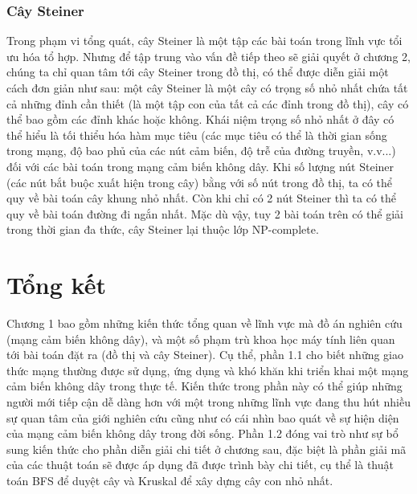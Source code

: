 \subsubsection{Cây Steiner}
Trong phạm vi tổng quát, cây Steiner là một tập các bài toán trong lĩnh vực tổi ưu hóa tổ hợp. Nhưng để tập trung vào vấn đề tiếp theo sẽ giải quyết ở chương 2, chúng ta chỉ quan tâm tới cây Steiner trong đồ thị, có thể được diễn giải một cách đơn giản như sau: một cây Steiner là một cây có trọng số nhỏ nhất chứa tất cả những đỉnh cần thiết (là một tập con của tất cả các đỉnh trong đồ thị), cây có thể bao gồm các đỉnh khác hoặc không. Khái niệm trọng số nhỏ nhất ở đây có thể hiểu là tối thiểu hóa hàm mục tiêu (các mục tiêu có thể là thời gian sống trong mạng, độ bao phủ của các nút cảm biến, độ trễ của đường truyền, v.v...) đối với các bài toán trong mạng cảm biến không dây. Khi số lượng nút Steiner (các nút bắt buộc xuất hiện trong cây) bằng với số nút trong đồ thị, ta có thể quy về bài toán cây khung nhỏ nhất. Còn khi chỉ có 2 nút Steiner thì ta có thể quy về bài toán đường đi ngắn nhất. Mặc dù vậy, tuy 2 bài toán trên có thể giải trong thời gian đa thức, cây Steiner lại thuộc lớp NP-complete.\cite{karp1972reducibility}

\section{Tổng kết}
Chương 1 bao gồm những kiến thức tổng quan về lĩnh vực mà đồ án nghiên cứu (mạng cảm biến không dây), và một số phạm trù khoa học máy tính liên quan tới bài toán đặt ra (đồ thị và cây Steiner). Cụ thể, phần 1.1 cho biết những giao thức mạng thường được sử dụng, ứng dụng và khó khăn khi triển khai một mạng cảm biến không dây trong thực tế. Kiến thức trong phần này có thể giúp những người mới tiếp cận dễ dàng hơn với một trong những lĩnh vực đang thu hút nhiều sự quan tâm của giới nghiên cứu cũng như có cái nhìn bao quát về sự hiện diện của mạng cảm biến không dây trong đời sống. Phần 1.2 đóng vai trò như sự bổ sung kiến thức cho phần diễn giải chi tiết ở chương sau, đặc biệt là phần giải mã của các thuật toán sẽ được áp dụng đã được trình bày chi tiết, cụ thể là thuật toán BFS để duyệt cây và Kruskal để xây dựng cây con nhỏ nhất.